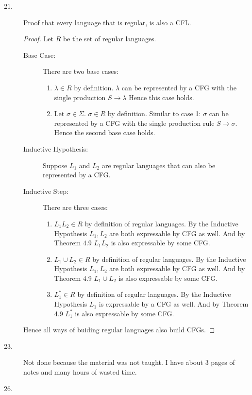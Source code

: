\documentclass{article}
\begin{document}
\begin{description}
\item[21.]
  Proof that every language that is regular, is also a CFL.\\
  \begin{proof}
    Let $R$ be the set of regular languages.
    \begin{description}
    \item[Base Case:]
      There are two base cases:
      \begin{enumerate}
      \item $\lambda \in R$ by definition. $\lambda$ can be represented by a CFG with the single production $S \rightarrow \lambda$
        Hence this case holds.
      \item Let $\sigma \in \Sigma$. $\sigma \in R$ by definition. Similar to case 1: $\sigma$ can be represented by a CFG with the single production rule $S \rightarrow \sigma$.
        Hence the second base case holds.
      \end{enumerate}
    \item[Inductive Hypothesis:]
      Suppose $L_1$ and $L_2$ are regular languages that can also be represented by a CFG.
    \item[Inductive Step:]
      There are three cases:
      \begin{enumerate}
      \item 
        $L_1L_2 \in R$ by definition of regular languages. By the Inductive Hypothesis $L_1, L_2$ are both expressable by CFG as well. And by Theorem 4.9 $L_1L_2$ is also expressable by some CFG.
      \item
        $L_1 \cup L_2 \in R$ by definition of regular languages. By the Inductive Hypothesis $L_1, L_2$ are both expressable by CFG as well. And by Theorem 4.9 $L_1 \cup L_2$ is also expressable by some CFG.
      \item
        $L_1^* \in R$ by definition of regular languages. By the Inductive Hypothesis $L_1$ is expressable by a CFG as well. And by Theorem 4.9 $L_1^*$ is also expressable by some CFG.
      \end{enumerate}
    \end{description}
    Hence all ways of buiding regular languages also build CFGs.
  \end{proof}
\item[23.]
  Not done because the material was not taught. I have about 3 pages of notes and many hours of wasted time.
\item[26.]\hfill\\
  \begin{description}

\end{description}
\end{description}
\end{document}
